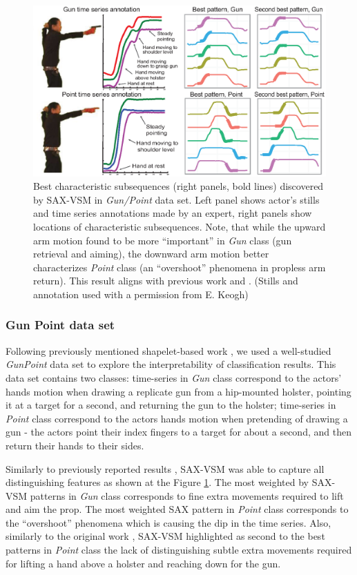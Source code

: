 \begin{figure}[ht]
   \centering
   \includegraphics[width=120mm]{figures/gun-point.eps}
   \caption{Best characteristic subsequences (right panels, bold lines) discovered by SAX-VSM in
   \textit{Gun/Point} data set. 
   Left panel shows actor's stills and time series annotations made by an expert, 
   right panels show locations of characteristic subsequences.
   Note, that while the upward arm motion found to be more ``important'' in \textit{Gun} 
   class (gun retrieval and aiming), the downward arm motion better characterizes 
   \textit{Point} class (an ``overshoot'' phenomena in propless arm return). 
   This result aligns with previous work \cite{citeulike:7344347} and \cite{citeulike:11345338}.
   (Stills and annotation used with a permission from E. Keogh) }
   \label{fig:shapelet-like-patterns}
\end{figure}

\subsubsection{Gun Point data set}
Following previously mentioned shapelet-based work \cite{citeulike:7344347, citeulike:11345338}, 
we used a well-studied \textit{GunPoint} data set \cite{Ratanamahatana04makingtime-series} to explore the 
interpretability of classification results. This data set contains two classes: 
time-series in \textit{Gun} class correspond to the actors' hands motion when drawing
a replicate gun from a hip-mounted holster, pointing it at a target for a second,
and returning the gun to the holster; 
time-series in \textit{Point} class correspond to the actors hands motion when pretending
of drawing a gun - the actors point their index fingers to a target for about a second, 
and then return their hands to their sides. 

Similarly to previously reported results \cite{citeulike:7344347, citeulike:11345338}, 
SAX-VSM was able to capture all distinguishing features as shown at the 
Figure \ref{fig:shapelet-like-patterns}. The most weighted by SAX-VSM patterns in 
\textit{Gun} class corresponds to fine extra movements required to lift and aim the prop. 
The most weighted SAX pattern in \textit{Point} class corresponds to the ``overshoot''
phenomena which is causing the dip in the time series. 
Also, similarly to the original work \cite{Ratanamahatana04makingtime-series}, SAX-VSM highlighted as second to the best
patterns in \textit{Point} class the lack of distinguishing subtle extra movements required
for lifting a hand above a holster and reaching down for the gun.

